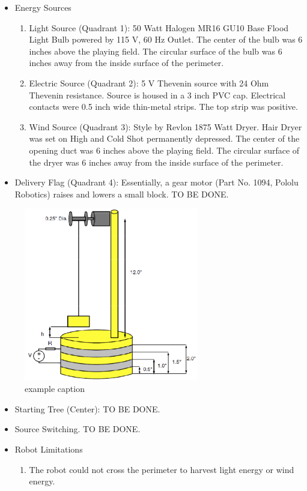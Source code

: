 \documentclass[12pt]{article}
\begin{document}
\begin{itemize}
	\item Energy Sources
		\begin{enumerate}
			\item Light Source (Quadrant 1): 50 Watt Halogen MR16 GU10 Base Flood Light Bulb powered by 115 V, 60 Hz Outlet. The center of the bulb was 6 inches above the playing field. The circular surface of the bulb was 6 inches away from the inside surface of the perimeter. 
			\item Electric Source (Quadrant 2): 5 V Thevenin source with 24 Ohm Thevenin resistance. Source is housed in a 3 inch PVC cap. Electrical contacts were 0.5 inch wide thin-metal strips. The top strip was positive. 
			\item Wind Source (Quadrant 3): Style by Revlon 1875 Watt Dryer. Hair Dryer was set on High and Cold Shot permanently depressed. The center of the opening duct was 6 inches above the playing field. The circular surface of the dryer was 6 inches away from the inside surface of the perimeter. 
		\end{enumerate} 
\end{itemize}
\begin{itemize}
	\item Delivery Flag (Quadrant 4): Essentially, a gear motor (Part No. 1094, Pololu Robotics) raises and lowers a small block. TO BE DONE. 
\end{itemize}
\begin{figure}[htbp] %
   \centering
   \includegraphics[width=3in]{Robotics2012Flag} 
   \caption{example caption}
   \label{fig:example}
\end{figure}
\begin{itemize}
	\item Starting Tree (Center): TO BE DONE.
	\item Source Switching. TO BE DONE.  
	\item Robot Limitations
		\begin {enumerate}
			\item The robot could not cross the perimeter to harvest light energy or wind energy. 
		\end {enumerate}
\end{itemize}
\end{document}
